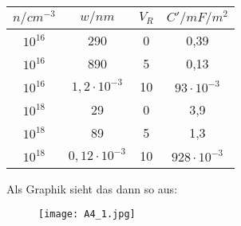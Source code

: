 \begin{center}
	\begin{tabular}{c|c|c|c}
		$n/cm^{-3}$ & $w/ nm$ & $V_R$ & $C'/ mF/m^2$ \\ 
		\hline  
	$10^{16}$	& 290 & 0 & 0,39 \\ 
	$10^{16}$	& 890 & 5 & 0,13 \\ 
	$10^{16}$	& $1,2 \cdot 10^{-3}$ & 10 & $93 \cdot 10^{-3}$ \\ 
	$10^{18}$	& 29 & 0 & 3,9 \\ 
	$10^{18}$	& 89 & 5 & 1,3 \\ 
	$10^{18}$	& $0,12 \cdot 10^{-3}$ & 10 & $928 \cdot 10^{-3}$ \\ 	
	\end{tabular} 
\end{center}

\newpage

Als Graphik sieht das dann so aus:

\begin{figure}[h]
	\centering
	\texttt{[image: A4\_1.jpg]}
\end{figure}









 



